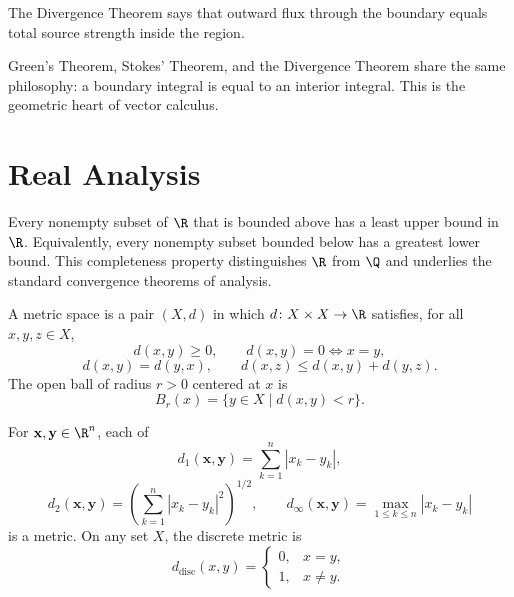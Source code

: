     \begin{idea}
        The Divergence Theorem says that outward flux through the boundary
        equals total source strength inside the region.
    \end{idea}

    \begin{remark}
        Green's Theorem, Stokes' Theorem, and the Divergence Theorem share the
        same philosophy: a boundary integral is equal to an interior integral.
        This is the geometric heart of vector calculus.
    \end{remark}

    \section*{Real Analysis}

    \begin{theorem}
        Every nonempty subset of $\R$ that is bounded above has a least upper
        bound in $\R$. Equivalently, every nonempty subset bounded below has a
        greatest lower bound. This completeness property distinguishes $\R$
        from $\Q$ and underlies the standard convergence theorems of analysis.
    \end{theorem}

    \begin{definition}
        A metric space is a pair $(X,d)$ in which $d\colon X\times X\to\R$ satisfies,
        for all $x,y,z\in X$,
        \[
            d(x,y)\geq 0,
            \qquad
            d(x,y)=0\Leftrightarrow x=y,
        \]
        \[
            d(x,y)=d(y,x),
            \qquad
            d(x,z)\leq d(x,y)+d(y,z).
        \]
        The open ball of radius $r>0$ centered at $x$ is
        \[
            B_r(x)=\{y\in X\mid d(x,y)<r\}.
        \]
    \end{definition}

    \begin{fact}
        For $\mathbf{x},\mathbf{y}\in\R^n$, each of
        \[
            d_1(\mathbf{x},\mathbf{y})
            =
            \sum_{k=1}^{n}|x_k-y_k|,
        \]
        \[
            d_2(\mathbf{x},\mathbf{y})
            =
            \left(
                \sum_{k=1}^{n}|x_k-y_k|^2
            \right)^{1/2},
            \qquad
            d_\infty(\mathbf{x},\mathbf{y})
            =
            \max_{1\leq k\leq n}|x_k-y_k|
        \]
        is a metric. On any set $X$, the discrete metric is
        \[
            d_{\mathrm{disc}}(x,y)
            =
            \begin{cases}
                0, & x=y,\\
                1, & x\neq y.
            \end{cases}
        \]
    \end{fact}

